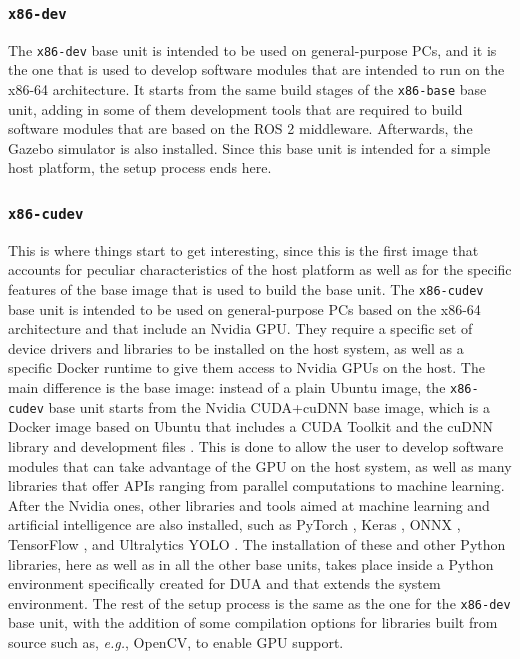 \subsubsection{\texttt{x86-dev}}
\label{sec:dua_base_units_x86-dev}
The \texttt{x86-dev} base unit is intended to be used on general-purpose PCs, and it is the one that is used to develop software modules that are intended to run on the x86-64 architecture. It starts from the same build stages of the \texttt{x86-base} base unit, adding in some of them development tools that are required to build software modules that are based on the ROS 2 middleware. Afterwards, the Gazebo simulator is also installed. Since this base unit is intended for a simple host platform, the setup process ends here.

\subsubsection{\texttt{x86-cudev}}
\label{sec:dua_base_units_x86-cudev}
This is where things start to get interesting, since this is the first image that accounts for peculiar characteristics of the host platform as well as for the specific features of the base image that is used to build the base unit. The \texttt{x86-cudev} base unit is intended to be used on general-purpose PCs based on the x86-64 architecture and that include an Nvidia GPU. They require a specific set of device drivers and libraries to be installed on the host system, as well as a specific Docker runtime to give them access to Nvidia GPUs on the host. The main difference is the base image: instead of a plain Ubuntu image, the \texttt{x86-cudev} base unit starts from the Nvidia CUDA+cuDNN base image, which is a Docker image based on Ubuntu that includes a CUDA Toolkit \cite{nvidia_cuda_nodate} and the cuDNN library and development files \cite{nvidia_cuda_nodate-1}. This is done to allow the user to develop software modules that can take advantage of the GPU on the host system, as well as many libraries that offer APIs ranging from parallel computations to machine learning. After the Nvidia ones, other libraries and tools aimed at machine learning and artificial intelligence are also installed, such as PyTorch \cite{pytorch_foundation_pytorch_nodate}, Keras \cite{chollet_keras_nodate}, ONNX \cite{linux_foundation_onnx_nodate}, TensorFlow \cite{google_brain_team_tensorflow_nodate}, and Ultralytics YOLO \cite{ultralytics_inc_ultralytics_nodate}. The installation of these and other Python libraries, here as well as in all the other base units, takes place inside a Python environment specifically created for DUA and that extends the system environment. The rest of the setup process is the same as the one for the \texttt{x86-dev} base unit, with the addition of some compilation options for libraries built from source such as, \emph{e.g.}, OpenCV, to enable GPU support.

